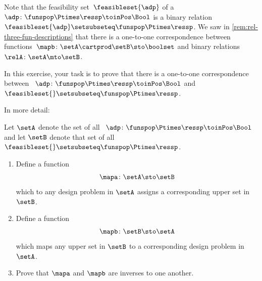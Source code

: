 Note that the feasibility set~$\feasibleset{\adp}$ of a ~$\adp \colon \funspop \Ptimes \ressp\toinPos \Bool$ is a binary relation~$\feasibleset{\adp} \setsubseteq \funspop \Ptimes \ressp$.
We saw in \cref{rem:rel-three-fun-descriptions} that there is a one-to-one correspondence between functions~$\mapb \colon \setA \cartprod \setB \sto \boolset$ and binary relations~$\relA\colon \setA \mto \setB$.




\begin{gradedexercise}
    \label{ex:DPsAsUpperSets}

    In this exercise, your task is to prove that there is a one-to-one correspondence between ~$\adp \colon \funspop \Ptimes \ressp\toinPos \Bool$ and ~$\feasibleset{} \setsubseteq \funspop \Ptimes \ressp$.

    In more detail:

    Let $\setA$ denote the set of all ~$\adp \colon \funspop \Ptimes \ressp\toinPos \Bool$ and let $\setB$ denote that set of all ~$\feasibleset{} \setsubseteq \funspop \Ptimes \ressp$.

    \begin{enumerate}
        \item Define a function
              \begin{equation*}
                  \mapa \colon \setA \sto \setB
              \end{equation*}
              which to any design problem in $\setA$ assigns a corresponding upper set in $\setB$.

        \item Define a function
              \begin{equation*}
                  \mapb \colon \setB \sto \setA
              \end{equation*}
              which maps any upper set in $\setB$ to a corresponding design problem in $\setA$.
        \item Prove that $\mapa$ and $\mapb$ are inverses to one another.
    \end{enumerate}
\end{gradedexercise}



